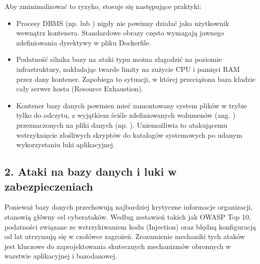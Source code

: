 \documentclass[letterpaper,10pt,english]{sphinxmanual}
\begin{document}
\sphinxAtStartPar
Aby zminimalizować to ryzyko, stosuje się następujące praktyki:
\begin{itemize}
\item {} 
\sphinxAtStartPar
{} Procesy DBMS (np.  lub ) nigdy nie powinny działać jako użytkownik  wewnątrz kontenera. Standardowe obrazy często wymagają jawnego zdefiniowania dyrektywy  w pliku Dockerfile.

\item {} 
\sphinxAtStartPar
{} Podatność silnika bazy na ataki typu  można złagodzić na poziomie infrastruktury, nakładając twarde limity na zużycie CPU i pamięci RAM przez dany kontener. Zapobiega to sytuacji, w której przeciążona baza kładzie cały serwer hosta (Resource Exhaustion).

\item {} 
\sphinxAtStartPar
{} Kontener bazy danych powinien mieć zamontowany system plików w trybie tylko do odczytu, z wyjątkiem ściśle zdefiniowanych wolumenów (ang. ) przeznaczonych na pliki danych (np. ). Uniemożliwia to atakującemu wstrzyknięcie złośliwych skryptów do katalogów systemowych po udanym wykorzystaniu luki aplikacyjnej.

\end{itemize}

\sphinxstepscope


\subsection{2. Ataki na bazy danych i luki w zabezpieczeniach}
\label{\detokenize{rozdzial_2/rozdzial_27/rozdzial_2:ataki-na-bazy-danych-i-luki-w-zabezpieczeniach}}\label{\detokenize{rozdzial_2/rozdzial_27/rozdzial_2::doc}}
\sphinxAtStartPar
Ponieważ bazy danych przechowują najbardziej krytyczne informacje organizacji, stanowią główny cel cyberataków. Według zestawień takich jak OWASP Top 10, podatności związane ze wstrzykiwaniem kodu (Injection) oraz błędną konfiguracją od lat utrzymują się w czołówce zagrożeń. Zrozumienie mechaniki tych ataków jest kluczowe do zaprojektowania skutecznych mechanizmów obronnych w warstwie aplikacyjnej i bazodanowej.
\end{document}
